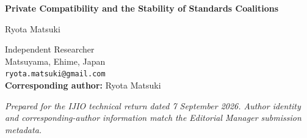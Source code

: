 \documentclass[11pt]{article}
\begin{document}
\begin{center}
{\Large\bfseries Private Compatibility and the Stability of Standards Coalitions\par}
\vspace{2em}
{\large Ryota Matsuki\par}
\vspace{1em}
Independent Researcher\\
Matsuyama, Ehime, Japan\\
\texttt{ryota.matsuki@gmail.com}\\
\vspace{1em}
\textbf{Corresponding author:} Ryota Matsuki
\end{center}

\vfill
\noindent\textit{Prepared for the IJIO technical return dated 7 September 2026. Author identity and corresponding-author information match the Editorial Manager submission metadata.}
\end{document}
